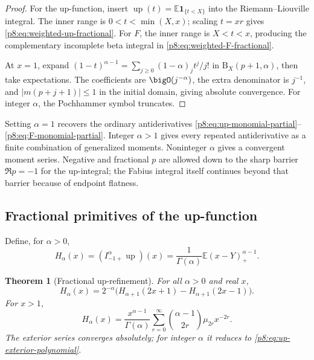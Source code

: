 \documentclass[11pt,oneside]{article}
\newtheorem{theorem}{Theorem}[section]
\theoremstyle{definition}
\theoremstyle{remark}
\newcommand{\Up}{\operatorname{up}}
\newcommand{\E}{\mathbb E}
\newcommand{\1}{\mathbf 1}
\begin{document}
\begin{proof}
For the up-function, insert
\(\Up(t)=\E\mathbf1_{\{t<X\}}\) into the Riemann--Liouville integral.  The
inner range is \(0<t<\min(X,x)\); scaling \(t=xr\) gives
\eqref{p8:eq:weighted-up-fractional}.  For \(F\), the inner range is
\(X<t<x\), producing the complementary incomplete beta integral in
\eqref{p8:eq:weighted-F-fractional}.

At \(x=1\), expand
\((1-t)^{\alpha-1}=\sum_{j\ge0}(1-\alpha)_jt^j/j!\) in
\(\mathrm B_X(p+1,\alpha)\), then take expectations.  The coefficients are
\(\bigO(j^{-\alpha})\), the extra denominator is \(j^{-1}\), and
\(|m(p+j+1)|\le1\) in the initial domain, giving absolute convergence.
For integer \(\alpha\), the Pochhammer symbol truncates.
\end{proof}

\begin{remark}
Setting \(\alpha=1\) recovers the ordinary antiderivatives
\eqref{p8:eq:up-monomial-partial}--\eqref{p8:eq:F-monomial-partial}.  Integer
\(\alpha>1\) gives every repeated antiderivative as a finite combination of
generalized moments.  Noninteger \(\alpha\) gives a convergent moment series.
Negative and fractional \(p\) are allowed down to the sharp barrier
\(\Re p=-1\) for the up-integral; the Fabius integral itself continues beyond
that barrier because of endpoint flatness.
\end{remark}

\subsection{Fractional primitives of the up-function}

Define, for \(\alpha>0\),
\begin{equation}
 H_\alpha(x)=(I_{-1+}^{\alpha}\Up)(x)
 =\frac1{\Gamma(\alpha)}\E(x-Y)_+^{\alpha-1}.
 \label{p8:eq:Halpha}
\end{equation}

\begin{theorem}[Fractional up-refinement]
\label{p8:thm:up-fractional-refinement}
For all \(\alpha>0\) and real \(x\),
\begin{equation}
 \boxed{
 H_\alpha(x)=2^{-\alpha}
 \bigl(H_{\alpha+1}(2x+1)-H_{\alpha+1}(2x-1)\bigr).}
 \label{p8:eq:up-fractional-refinement}
\end{equation}
For \(x>1\),
\begin{equation}
 \boxed{
 H_\alpha(x)=\frac{x^{\alpha-1}}{\Gamma(\alpha)}
 \sum_{r=0}^{\infty}
 \binom{\alpha-1}{2r}\mu_{2r}x^{-2r}.}
 \label{p8:eq:Halpha-exterior}
\end{equation}
The exterior series converges absolutely; for integer \(\alpha\) it reduces to
\eqref{p8:eq:up-exterior-polynomial}.  \statusprovedPartll
\end{theorem}
\end{document}
